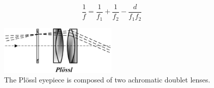 \documentclass[a4paper]{report}
\begin{document}
\begin{equation}
\frac{1}{f} = \frac{1}{f_1} + \frac{1}{f_2} - \frac{d}{f_1f_2}
\label{eq:compoundLensF}
\end{equation}


\begin{figure}[h]
\center
\includegraphics[width=2.2in]{Plossl.eps}
\caption{The Pl\"{o}ssl eyepiece is composed of two achromatic doublet lenses.}
\label{fig:composite}
\end{figure}
\end{document}
